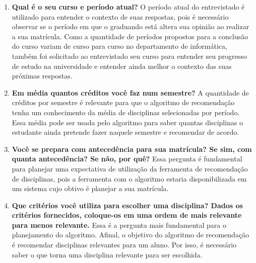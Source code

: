 \begin{enumerate}
    \item \textbf{Qual é o seu curso e período atual?} O período atual do entrevistado é utilizado para entender o contexto de suas respostas, pois é necessário observar se o período em que o graduando está altera sua opinião ao realizar a sua matrícula. Como a quantidade de períodos propostos para a conclusão do curso variam de curso para curso no departamento de informática, também foi solicitado ao entrevistado seu curso para entender seu progresso de estudo na universidade e entender ainda melhor o contexto das suas próximas respostas.
        
    
    \item \textbf{Em média quantos créditos você faz num semestre?} A quantidade de créditos por semestre é relevante para que o algoritmo de recomendação tenha um conhecimento da média de disciplinas selecionadas por período. Essa média pode ser usada pelo algoritmo para saber quantas disciplinas o estudante ainda pretende fazer naquele semestre e recomendar de acordo.
    
    \item \textbf{Você se prepara com anteced\^encia para sua matr\'icula? Se sim, com quanta anteced\^encia? Se não, por quê?} Essa pergunta é fundamental para planejar uma expectativa de utilização da ferramenta de recomendação de disciplinas, pois a ferramenta com o algoritmo estaria disponibilizada em um sistema cujo obtivo é planejar a sua matr\'icula.
    
    
    \item \textbf{Que crit\'erios você utiliza para escolher uma disciplina? Dados os critérios fornecidos, coloque-os em uma ordem de mais relevante para menos relevante.} Essa é a pergunta mais fundamental para o planejamento do algoritmo. Afinal, o objetivo do algoritmo de recomendação é recomendar disciplinas relevantes para um aluno. Por isso, é necessário saber o que torna uma disciplina relevante para ser escolhida.
        

\end{enumerate}
